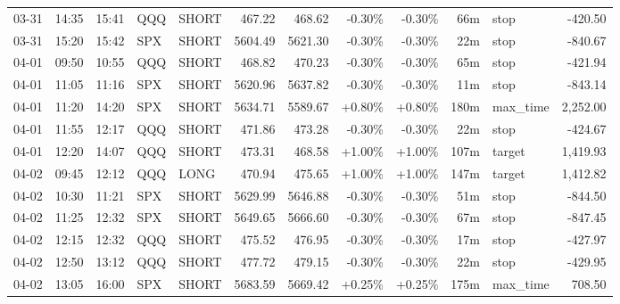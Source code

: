 \documentclass[11pt,a4paper]{article}
\begin{document}
\begin{center}
\begin{longtable}{>{\color{txtmain}}l l l l l r r r r r >{\color{txtmain}}l r}
03-31 & 14:35 & 15:41 & QQQ & SHORT & 467.22 & 468.62 & \textcolor{lossred}{-0.30\%} & \textcolor{lossred}{-0.30\%} & 66m & stop & \textcolor{lossred}{-420.50} \\
03-31 & 15:20 & 15:42 & SPX & SHORT & 5604.49 & 5621.30 & \textcolor{lossred}{-0.30\%} & \textcolor{lossred}{-0.30\%} & 22m & stop & \textcolor{lossred}{-840.67} \\
04-01 & 09:50 & 10:55 & QQQ & SHORT & 468.82 & 470.23 & \textcolor{lossred}{-0.30\%} & \textcolor{lossred}{-0.30\%} & 65m & stop & \textcolor{lossred}{-421.94} \\
04-01 & 11:05 & 11:16 & SPX & SHORT & 5620.96 & 5637.82 & \textcolor{lossred}{-0.30\%} & \textcolor{lossred}{-0.30\%} & 11m & stop & \textcolor{lossred}{-843.14} \\
04-01 & 11:20 & 14:20 & SPX & SHORT & 5634.71 & 5589.67 & \textcolor{wingreen}{+0.80\%} & \textcolor{wingreen}{+0.80\%} & 180m & max\_time & \textcolor{wingreen}{2,252.00} \\
04-01 & 11:55 & 12:17 & QQQ & SHORT & 471.86 & 473.28 & \textcolor{lossred}{-0.30\%} & \textcolor{lossred}{-0.30\%} & 22m & stop & \textcolor{lossred}{-424.67} \\
04-01 & 12:20 & 14:07 & QQQ & SHORT & 473.31 & 468.58 & \textcolor{wingreen}{+1.00\%} & \textcolor{wingreen}{+1.00\%} & 107m & target & \textcolor{wingreen}{1,419.93} \\
04-02 & 09:45 & 12:12 & QQQ & LONG & 470.94 & 475.65 & \textcolor{wingreen}{+1.00\%} & \textcolor{wingreen}{+1.00\%} & 147m & target & \textcolor{wingreen}{1,412.82} \\
04-02 & 10:30 & 11:21 & SPX & SHORT & 5629.99 & 5646.88 & \textcolor{lossred}{-0.30\%} & \textcolor{lossred}{-0.30\%} & 51m & stop & \textcolor{lossred}{-844.50} \\
04-02 & 11:25 & 12:32 & SPX & SHORT & 5649.65 & 5666.60 & \textcolor{lossred}{-0.30\%} & \textcolor{lossred}{-0.30\%} & 67m & stop & \textcolor{lossred}{-847.45} \\
04-02 & 12:15 & 12:32 & QQQ & SHORT & 475.52 & 476.95 & \textcolor{lossred}{-0.30\%} & \textcolor{lossred}{-0.30\%} & 17m & stop & \textcolor{lossred}{-427.97} \\
04-02 & 12:50 & 13:12 & QQQ & SHORT & 477.72 & 479.15 & \textcolor{lossred}{-0.30\%} & \textcolor{lossred}{-0.30\%} & 22m & stop & \textcolor{lossred}{-429.95} \\
04-02 & 13:05 & 16:00 & SPX & SHORT & 5683.59 & 5669.42 & \textcolor{wingreen}{+0.25\%} & \textcolor{wingreen}{+0.25\%} & 175m & max\_time & \textcolor{wingreen}{708.50} \\

\end{longtable}
\end{center}
\end{document}
